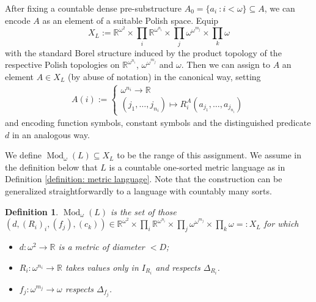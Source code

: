 \documentclass[12pt]{amsart}
\newtheorem{definition}[theorem]{Definition}
\DeclareMathOperator{\Mod}{Mod}
\begin{document}
After fixing a countable dense pre-substructure $A_0=\{a_i ~\colon i<\omega\} \subseteq A$, we can encode $A$ as an element of a suitable Polish space. Equip 
\begin{equation} \label{Borel L-structure}
    X_L:=\mathbb R^{\omega^2}\times\prod_i\mathbb R^{\omega^{n_i}}\times\prod_j\omega^{\omega^{m_j}}\times\prod_k\omega 
\end{equation}
with the standard Borel structure induced by the product topology of the respective Polish topologies on $\mathbb R^{\omega^{n_i}}$, $\omega^{\omega^{m_j}}$ and $\omega$. Then we can assign to $A$ an element $A\in X_L$ (by abuse of notation) in the canonical way, setting
\begin{align*}
    A(i):=\begin{cases}
    \omega^{n_i}\to\mathbb R\\
    (j_1,\dots,j_{n_i})\mapsto R_i^A(a_{j_1},\dots,a_{j_{n_i}})
\end{cases}
\end{align*}
and encoding function symbols, constant symbols and the distinguished predicate $d$ in an analogous way.

We define $\Mod_\omega(L)\subseteq X_L$ to be the range of this assignment. We assume in the definition below that $L$ is a countable one-sorted metric language as in Definition \ref{definition: metric language}. Note that the construction can be generalized straightforwardly to a language with countably many sorts. 

\begin{definition}\label{definition: Mod_omega(L)}
    $\Mod_\omega(L)$ is the set of those $(d,(R_i)_{i},(f_j),(c_k))\in \mathbb R^{\omega^2}\times \prod_{i}\mathbb R^{\omega^{n_i}}\times \prod_j\omega^{\omega^{m_j}}\times\prod_k\omega=:X_L$ for which
\begin{itemize}
    \item $d \colon \omega^2\to\mathbb R$ is a metric of diameter $<D$;
    \item $R_i \colon \omega^{n_i}\to\mathbb R$ takes values only in $I_{R_i}$ and respects $\Delta_{R_i}$.
    \item $f_j \colon \omega^{m_j}\to\omega$ respects $\Delta_{f_j}$.
\end{itemize}
\end{definition}
\end{document}
